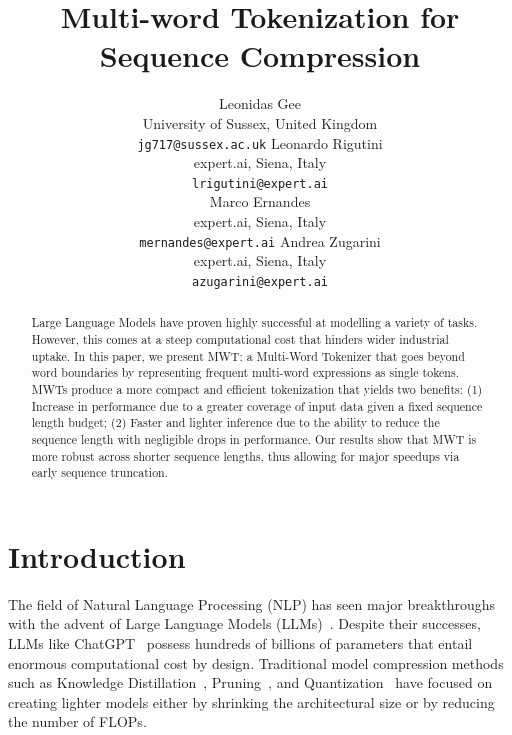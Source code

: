 \documentclass[11pt]{article}
\title{Multi-word Tokenization for Sequence Compression}
\author{Leonidas Gee\\
  University of Sussex, United Kingdom \\ \texttt{jg717@sussex.ac.uk}
  \And
  Leonardo Rigutini\\
  expert.ai, Siena, Italy\\
  \texttt{lrigutini@expert.ai}\\
  \AND
  Marco Ernandes\\
  expert.ai, Siena, Italy \\ \texttt{mernandes@expert.ai}
  \And
  Andrea Zugarini\\
  expert.ai, Siena, Italy \\ \texttt{azugarini@expert.ai}
}
\newcommand{\az}[1]{\color{black} #1}
\begin{document}
\maketitle



\begin{abstract}
Large Language Models have proven highly successful at modelling a variety of tasks. However, this comes at a steep computational cost that hinders wider industrial uptake. {\az In this paper, we present MWT: a Multi-Word Tokenizer that goes beyond word boundaries by representing frequent multi-word expressions as single tokens. MWTs produce a more compact and efficient tokenization that yields two benefits:} (1) Increase in performance due to a greater coverage of input data given a fixed sequence length budget; (2) Faster and lighter inference due to the ability to reduce the sequence length with negligible drops in performance. Our results show that MWT is more robust across shorter sequence lengths, thus allowing for major speedups via early sequence truncation.
\end{abstract}



\section{Introduction}\label{section:introduction}
The field of Natural Language Processing (NLP) has seen major breakthroughs with the advent of Large Language Models (LLMs)~\citep{Transformer, BERT, touvron2023llama,openai2023gpt4}. Despite their successes, LLMs like ChatGPT~\citep{openai2023gpt4, GPT3} possess hundreds of billions of parameters that entail enormous computational cost by design. {\az Traditional model compression methods such as Knowledge Distillation~\citep{Distillation}, Pruning~\citep{16Heads,Prune}, and Quantization~\citep{QBERT, Precision} have focused on creating lighter models either by shrinking the architectural size or by reducing the number of FLOPs.}
\end{document}
